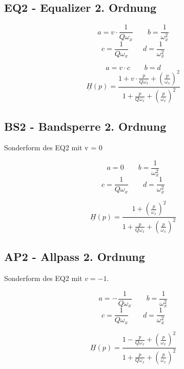 \documentclass[a4paper, 12pt]{report}
\begin{document}
\clearpage

	\subsection*{EQ2 - Equalizer 2. Ordnung}
		\begin{minipage}[t]{0.5\textwidth}
			\[ a = v \cdot \frac{1}{Q\omega_x} \qquad b = \frac{1}{\omega^2_x} \]
			\[ c = \frac{1}{Q\omega_x} \qquad d = \frac{1}{\omega^2_x} \]
		\end{minipage}
		\begin{minipage}[t]{0.5\textwidth}
			\[ a = v \cdot c \qquad b = d \]
			\vspace{-0.2cm}
			\[ \underline{H}(p) = \frac{1 + v\cdot\frac{p}{Q\omega_x} + \left(\frac{p}{\omega_x}\right)^2}{1 + \frac{p}{Q\omega_x} + \left(\frac{p}{\omega_x}\right)^2} \]
		\end{minipage}

	\subsection*{BS2 - Bandsperre 2. Ordnung}
		Sonderform des EQ2 mit v = 0
	
		\begin{minipage}[t]{0.5\textwidth}
			\[ a = 0 \qquad b = \frac{1}{\omega^2_x} \]
			\[ c = \frac{1}{Q\omega_x} \qquad d = \frac{1}{\omega^2_x} \]
		\end{minipage}
		\begin{minipage}[t]{0.5\textwidth}
			\[ \underline{H}(p) = \frac{1 + \left(\frac{p}{\omega_x}\right)^2}{1 + \frac{p}{Q\omega_x} + \left(\frac{p}{\omega_x}\right)^2} \]
		\end{minipage}
	
	\subsection*{AP2 - Allpass 2. Ordnung}
		Sonderform des EQ2 mit $ v = -1 $.
		
		\begin{minipage}[t]{0.5\textwidth}
			\[ a = -\frac{1}{Q\omega_x} \qquad b = \frac{1}{\omega^2_x} \]
			\[ c = \frac{1}{Q\omega_x} \qquad d = \frac{1}{\omega^2_x} \]
		\end{minipage}
		\begin{minipage}[t]{0.5\textwidth}
			\[ \underline{H}(p) = \frac{1 - \frac{p}{Q\omega_x} + \left(\frac{p}{\omega_x}\right)^2}{1 + \frac{p}{Q\omega_x} + \left(\frac{p}{\omega_x}\right)^2} \]
		\end{minipage}
\end{document}
